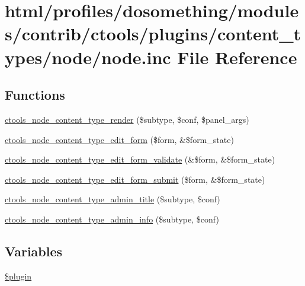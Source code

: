 \hypertarget{ctools_2plugins_2content__types_2node_2node_8inc}{
\section{html/profiles/dosomething/modules/contrib/ctools/plugins/content\_\-types/node/node.inc File Reference}
\label{ctools_2plugins_2content__types_2node_2node_8inc}
}
\subsection*{Functions}
\begin{DoxyCompactItemize}
\item 
\hyperlink{ctools_2plugins_2content__types_2node_2node_8inc_a064008098d492950aa49baa827c38e01}{ctools\_\-node\_\-content\_\-type\_\-render} (\$subtype, \$conf, \$panel\_\-args)
\item 
\hyperlink{ctools_2plugins_2content__types_2node_2node_8inc_a007c221ce820d3db454bd64933f74a04}{ctools\_\-node\_\-content\_\-type\_\-edit\_\-form} (\$form, \&\$form\_\-state)
\item 
\hyperlink{ctools_2plugins_2content__types_2node_2node_8inc_a523e47b1675b594c4294337fd11d13f9}{ctools\_\-node\_\-content\_\-type\_\-edit\_\-form\_\-validate} (\&\$form, \&\$form\_\-state)
\item 
\hyperlink{ctools_2plugins_2content__types_2node_2node_8inc_a8c0e3ce8bd37d7912ffc558deac9beff}{ctools\_\-node\_\-content\_\-type\_\-edit\_\-form\_\-submit} (\$form, \&\$form\_\-state)
\item 
\hyperlink{ctools_2plugins_2content__types_2node_2node_8inc_a068ff2b8f4980d9298271e438ce07811}{ctools\_\-node\_\-content\_\-type\_\-admin\_\-title} (\$subtype, \$conf)
\item 
\hyperlink{ctools_2plugins_2content__types_2node_2node_8inc_ab78d8c471389b734471e970cef7f7270}{ctools\_\-node\_\-content\_\-type\_\-admin\_\-info} (\$subtype, \$conf)
\end{DoxyCompactItemize}
\subsection*{Variables}
\begin{DoxyCompactItemize}
\item 
\hyperlink{ctools_2plugins_2content__types_2node_2node_8inc_ada8a7130088351710bb02ed622d6bf65}{\$plugin}
\end{DoxyCompactItemize}


